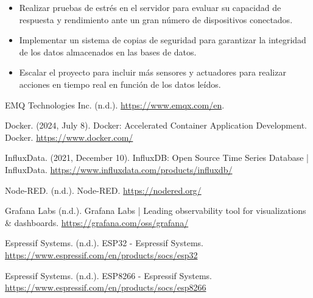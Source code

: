 \begin{itemize}
    \item Realizar pruebas de estrés en el servidor para evaluar su capacidad de respuesta y rendimiento ante un gran número de dispositivos conectados.
    \item Implementar un sistema de copias de seguridad para garantizar la integridad de los datos almacenados en las bases de datos.
    \item Escalar el proyecto para incluir más sensores y actuadores para realizar acciones en tiempo real en función de los datos leídos.
\end{itemize}

\begin{thebibliography}{9}
    EMQ Technologies Inc. (n.d.). \url{https://www.emqx.com/en}.
    
    Docker. (2024, July 8). Docker: Accelerated Container Application Development. Docker. \url{https://www.docker.com/}

    InfluxData. (2021, December 10). InfluxDB: Open Source Time Series Database | InfluxData. \url{https://www.influxdata.com/products/influxdb/}

    Node-RED. (n.d.). Node-RED. \url{https://nodered.org/}

    Grafana Labs (n.d.). Grafana Labs | Leading observability tool for visualizations \& dashboards. \url{https://grafana.com/oss/grafana/}

    Espressif Systems. (n.d.). ESP32 - Espressif Systems. \url{https://www.espressif.com/en/products/socs/esp32}

    Espressif Systems. (n.d.). ESP8266 - Espressif Systems. \url{https://www.espressif.com/en/products/socs/esp8266}
\end{thebibliography}
